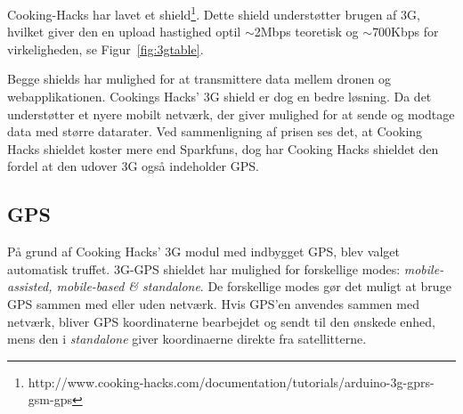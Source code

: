 Cooking-Hacks har lavet et shield\footnote{http://www.cooking-hacks.com/documentation/tutorials/arduino-3g-gprs-gsm-gps}. Dette shield understøtter brugen af 3G, hvilket giver den en upload hastighed optil $\sim$2Mbps teoretisk og $\sim$700Kbps for virkeligheden, se Figur~\ref{fig:3gtable}.

Begge shields har mulighed for at transmittere data mellem dronen og webapplikationen. Cookings Hacks' 3G shield er dog en bedre løsning. Da det understøtter et nyere mobilt netværk, der giver mulighed for at sende og modtage data med større datarater.
Ved sammenligning af prisen ses det, at Cooking Hacks shieldet koster mere end Sparkfuns, dog har Cooking Hacks shieldet den fordel at den udover 3G også indeholder GPS.

\subsection{GPS}

På grund af Cooking Hacks' 3G modul med indbygget GPS, blev valget automatisk truffet. 
3G-GPS shieldet har mulighed for forskellige modes: \textit{mobile-assisted, mobile-based \& standalone}. De forskellige modes gør det muligt at bruge GPS sammen med eller uden netværk. \newline 
Hvis GPS'en anvendes sammen med netværk, bliver GPS koordinaterne bearbejdet og sendt til den ønskede enhed, mens den i \textit{standalone} giver koordinaerne direkte fra satellitterne.

